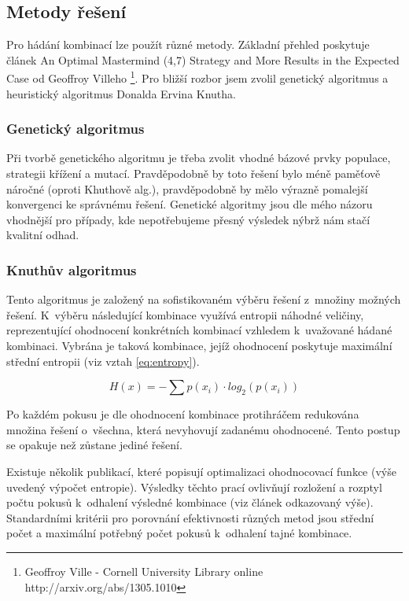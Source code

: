 \documentclass[12pt, a4paper]{article}
\begin{document}
\subsection{Metody řešení}

Pro hádání kombinací lze použít různé metody. Základní přehled poskytuje článek An Optimal Mastermind (4,7) Strategy and More Results in the Expected Case od Geoffroy Villeho \footnote{Geoffroy Ville - Cornell University Library online http://arxiv.org/abs/1305.1010}. Pro bližší rozbor jsem zvolil genetický algoritmus a heuristický algoritmus Donalda Ervina Knutha.

\subsubsection{Genetický algoritmus}

Při tvorbě genetického algoritmu je třeba zvolit vhodné bázové prvky populace, strategii křížení a mutací. Pravděpodobně by toto řešení bylo méně paměťově náročné (oproti Khuthově alg.), pravděpodobně by mělo výrazně pomalejší konvergenci ke správnému řešení. Genetické algoritmy jsou dle mého názoru vhodnější pro případy, kde nepotřebujeme přesný výsledek nýbrž nám stačí kvalitní odhad. 

\subsubsection{Knuthův algoritmus}

Tento algoritmus je založený na sofistikovaném výběru řešení z~množiny možných řešení. K~výběru následující kombinace využívá entropii náhodné veličiny, reprezentující ohodnocení konkrétních kombinací vzhledem k~uvažované hádané kombinaci. Vybrána je taková kombinace, jejíž ohodnocení poskytuje maximální střední entropii (viz vztah \ref{eq:entropy}).

\begin{equation}
H(x) = - \sum p(x_i) \cdot log_2(p(x_i))
\label{eq:entropy}
\end{equation}

Po každém pokusu je dle ohodnocení kombinace protihráčem redukována množina řešení o~všechna, která nevyhovují zadanému ohodnocené. Tento postup se opakuje než zůstane jediné řešení.

Existuje několik publikací, které popisují optimalizaci ohodnocovací funkce (výše uvedený výpočet entropie). Výsledky těchto prací ovlivňují rozložení a rozptyl počtu pokusů k~odhalení výsledné kombinace (viz článek odkazovaný výše). Standardními kritérii pro porovnání efektivnosti různých metod jsou střední počet a maximální potřebný počet pokusů k~odhalení tajné kombinace.
\end{document}
